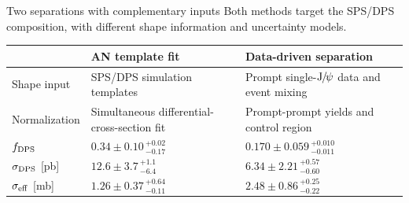 \documentclass[11pt,aspectratio=169]{beamer}
\begin{document}
\begin{frame}[label=p21]{Two separations with complementary inputs}
  \centering
  \small Both methods target the SPS/DPS composition, with different shape information and uncertainty models.

  \vspace{0.45em}
  \renewcommand{\arraystretch}{1.24}
  \begin{tabular}{>{\raggedright\arraybackslash}p{}
                  >{\raggedright\arraybackslash}p{}
                  >{\raggedright\arraybackslash}p{}}
    \toprule
    & AN template fit & Data-driven separation \\
    \midrule
    Shape input & SPS/DPS simulation templates & Prompt single-$\mathrm{J}\hspace{-.08em}/\hspace{-.14em}\psi$ data and event mixing \\
    Normalization & Simultaneous differential-cross-section fit & Prompt-prompt yields and control region \\
    $f_{\rm DPS}$
      & $0.34\pm0.10\,{}^{+0.02}_{-0.17}$
      & $0.170\pm0.059\,{}^{+0.010}_{-0.011}$ \\
    $\sigma_{\rm DPS}$ [pb]
      & $12.6\pm3.7\,{}^{+1.1}_{-6.4}$
      & $6.34\pm2.21\,{}^{+0.57}_{-0.60}$ \\
    $\sigma_{\rm eff}$ [mb]
      & $1.26\pm0.37\,{}^{+0.64}_{-0.11}$
      & $2.48\pm0.86\,{}^{+0.25}_{-0.22}$ \\
    \bottomrule
  \end{tabular}

  \vfill
\end{frame}
\end{document}
